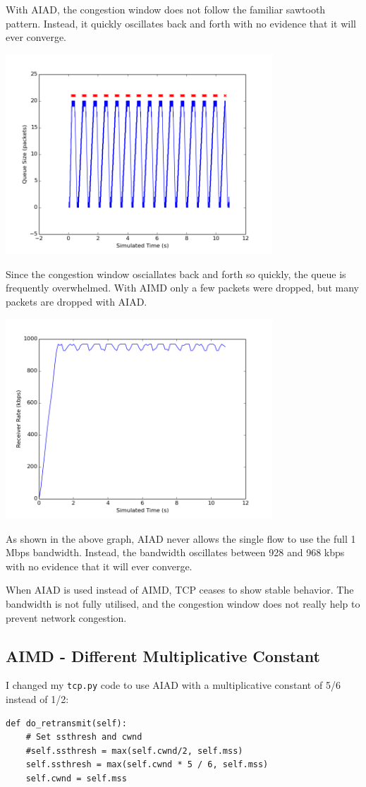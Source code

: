 \documentclass[11pt]{article}
\newcommand{\code}[1]{\texttt{#1}}
\begin{document}
With AIAD, the congestion window does not follow the familiar sawtooth pattern. Instead, it quickly oscillates back and forth with no evidence that it will ever converge.

\includegraphics[width=10cm]{../graphs/aiad_queue_size.png}

Since the congestion window osciallates back and forth so quickly, the queue is frequently overwhelmed. With AIMD only a few packets were dropped, but many packets are dropped with AIAD.

\includegraphics[width=10cm]{../graphs/aiad_receiver_rate.png}

As shown in the above graph, AIAD never allows the single flow to use the full 1 Mbps bandwidth. Instead, the bandwidth oscillates between 928 and 968 kbps with no evidence that it will ever converge.

When AIAD is used instead of AIMD, TCP ceases to show stable behavior. The bandwidth is not fully utilised, and the congestion window does not really help to prevent network congestion.

\pagebreak
\subsection{AIMD - Different Multiplicative Constant}
I changed my \code{tcp.py} code to use AIAD with a multiplicative constant of 5/6 instead of 1/2:
\begin{lstlisting}
def do_retransmit(self):
	# Set ssthresh and cwnd
	#self.ssthresh = max(self.cwnd/2, self.mss)
	self.ssthresh = max(self.cwnd * 5 / 6, self.mss)
	self.cwnd = self.mss
\end{lstlisting}
\end{document}
